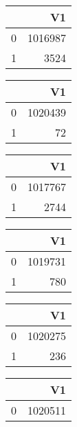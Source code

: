 \bigskip\bigskip
\centering
\begin{tabular}{rr}
  \hline
 & V1 \\ 
  \hline
0 & 1016987 \\ 
  1 & 3524 \\ 
   \hline
\end{tabular}

\bigskip\bigskip
\centering
\begin{tabular}{rr}
  \hline
 & V1 \\ 
  \hline
0 & 1020439 \\ 
  1 &  72 \\ 
   \hline
\end{tabular}

\bigskip\bigskip
\centering
\begin{tabular}{rr}
  \hline
 & V1 \\ 
  \hline
0 & 1017767 \\ 
  1 & 2744 \\ 
   \hline
\end{tabular}

\bigskip\bigskip
\centering
\begin{tabular}{rr}
  \hline
 & V1 \\ 
  \hline
0 & 1019731 \\ 
  1 & 780 \\ 
   \hline
\end{tabular}

\bigskip\bigskip
\centering
\begin{tabular}{rr}
  \hline
 & V1 \\ 
  \hline
0 & 1020275 \\ 
  1 & 236 \\ 
   \hline
\end{tabular}

\bigskip\bigskip
\centering
\begin{tabular}{rr}
  \hline
 & V1 \\ 
  \hline
0 & 1020511 \\ 
   \hline
\end{tabular}

